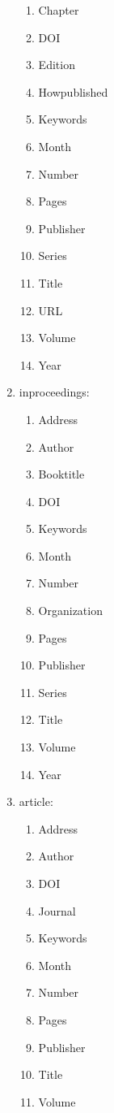 \documentclass[letter,12pt]{article}
\begin{document}
\begin{enumerate}
\begin{enumerate}
	\item Chapter
	\item DOI
	\item Edition
	\item Howpublished
	\item Keywords
	\item Month
	\item Number
	\item Pages
	\item Publisher
	\item Series
	\item Title
	\item URL
	\item Volume
	\item Year
	\end{enumerate}
\item inproceedings: \vspace{-0.3cm}
	\begin{enumerate} \itemsep -2pt
	\item Address
	\item Author
	\item Booktitle
	\item DOI
	\item Keywords
	\item Month
	\item Number
	\item Organization
	\item Pages
	\item Publisher
	\item Series
	\item Title
	\item Volume
	\item Year
	\end{enumerate}
\item article: \vspace{-0.3cm}
	\begin{enumerate} \itemsep -2pt
	\item Address
	\item Author
	\item DOI
	\item Journal
	\item Keywords
	\item Month
	\item Number
	\item Pages
	\item Publisher
	\item Title
	\item Volume

\end{enumerate}
\end{enumerate}
\end{document}
